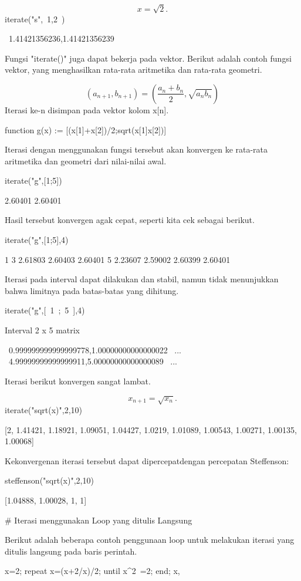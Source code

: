 \documentclass{article}
\begin{document}
$$x = \sqrt2.$$\>iterate("s",~1,2~)


    ~1.41421356236,1.41421356239~

Fungsi "iterate()" juga dapat bekerja pada vektor. Berikut adalah
contoh fungsi vektor, yang menghasilkan rata-rata aritmetika dan
rata-rata geometri.


$$(a_{n+1},b_{n+1}) = \left( \frac{a_n+b_n}{2}, \sqrt{a_nb_n} \right)$$Iterasi ke-n disimpan pada vektor kolom x[n].


\>function g(x) := [(x[1]+x[2])/2;sqrt(x[1]\*x[2])]


Iterasi dengan menggunakan fungsi tersebut akan konvergen ke rata-rata aritmetika dan
geometri dari nilai-nilai awal. 


\>iterate("g",[1;5])


          2.60401 
          2.60401 

Hasil tersebut konvergen agak cepat, seperti kita cek sebagai berikut.


\>iterate("g",[1;5],4)


                1             3       2.61803       2.60403       2.60401 
                5       2.23607       2.59002       2.60399       2.60401 

Iterasi pada interval dapat dilakukan dan stabil, namun tidak menunjukkan bahwa limitnya
pada batas-batas yang dihitung.


\>iterate("g",[~1~;~5~],4)


    Interval 2 x 5 matrix
    
    ~0.999999999999999778,1.00000000000000022~     ...
    ~4.99999999999999911,5.00000000000000089~     ...

Iterasi berikut konvergen sangat lambat.


$$x_{n+1} = \sqrt{x_n}.$$\>iterate("sqrt(x)",2,10)


    [2,  1.41421,  1.18921,  1.09051,  1.04427,  1.0219,  1.01089,
    1.00543,  1.00271,  1.00135,  1.00068]

Kekonvergenan iterasi tersebut dapat dipercepatdengan percepatan Steffenson:


\>steffenson("sqrt(x)",2,10)


    [1.04888,  1.00028,  1,  1]

# Iterasi menggunakan Loop yang ditulis Langsung

Berikut adalah beberapa contoh penggunaan loop untuk melakukan iterasi yang ditulis langsung
pada baris perintah.


\>x=2; repeat x=(x+2/x)/2; until x^2~=2; end; x,
\end{document}
